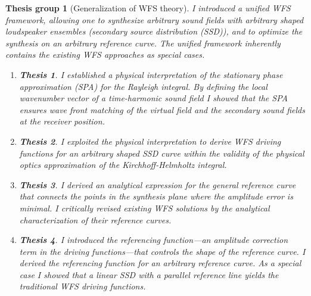 \documentclass[10pt,twoside]{article}
\theoremstyle{thesisgroupstyle}
\newtheorem{thesisgroup}{Thesis group}
\newtheorem{thesis}{Thesis}[thesisgroup]
\begin{document}
\begin{thesisgroup}[Generalization of WFS theory]
I introduced a unified WFS framework, allowing one to synthesize arbitrary sound fields with arbitrary shaped loudspeaker ensembles (secondary source distribution (SSD)), and to optimize the synthesis on an arbitrary reference curve. 
The unified framework inherently contains the existing WFS approaches as special cases.
\begin{enumerate}
\item[] \vspace{-7mm}\begin{thesis}I established a physical interpretation of the stationary phase approximation (SPA) for the Rayleigh integral.
By defining the local wavenumber vector of a time-harmonic sound field I showed that the SPA ensures wave front matching of the virtual field and the secondary sound fields at the receiver position.\end{thesis}
\item[] \vspace{-7mm}\begin{thesis}I exploited the physical interpretation to derive WFS driving functions for an arbitrary shaped SSD curve within the validity of the physical optics approximation of the Kirchhoff-Helmholtz integral.\end{thesis}
\item[] \vspace{-7mm}\begin{thesis}I derived an analytical expression for the general \emph{reference curve} that connects the points in the synthesis plane where the amplitude error is minimal.
I critically revised existing WFS solutions by the analytical characterization of their reference curves.\end{thesis}
\item[] \vspace{-7mm}\begin{thesis}I introduced the \emph{referencing function}---an amplitude correction term in the driving functions---that controls the shape of the reference curve.
I derived the referencing function for an arbitrary reference curve.
As a special case I showed that a linear SSD with a parallel reference line yields the traditional WFS driving functions.\end{thesis}
\end{enumerate}
\end{thesisgroup}
\end{document}
